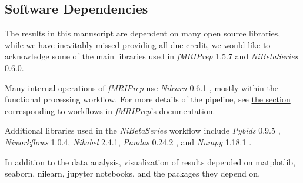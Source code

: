 \documentclass[10pt,letterpaper]{article}
\begin{document}
\subsection*{Software Dependencies}
\label{methods:software-dependencies}

The results in this manuscript are dependent on many open source
libraries, while we have inevitably missed providing all due credit,
we would like to acknowledge some of the main libraries used in 
\emph{fMRIPrep} 1.5.7\cite{fmriprep1} and \emph{NiBetaSeries} 0.6.0\cite{Kent2018}.

Many internal operations of \emph{fMRIPrep} use \emph{Nilearn} 0.6.1
\cite[RRID:SCR\_001362]{nilearn}, mostly within the functional
processing workflow. For more details of the pipeline, see
\href{https://fmriprep.readthedocs.io/en/latest/workflows.html}{the
section corresponding to workflows in \emph{fMRIPrep}'s documentation}.

Additional libraries used in the \emph{NiBetaSeries} workflow include
\emph{Pybids} 0.9.5 \cite{Yarkoni2019}, \emph{Niworkflows} 1.0.4,
\emph{Nibabel} 2.4.1, \emph{Pandas} 0.24.2 \cite{McKinney2010}, and
\emph{Numpy} 1.18.1 \cite{VanDerWalt2011, Oliphant2006}.

In addition to the data analysis, visualization of results depended
on matplotlib\cite{Hunter2007}, seaborn\cite{Waskom2020}, nilearn,
jupyter notebooks\cite{Kluyver2016a}, and the packages they depend on.


\end{document}
